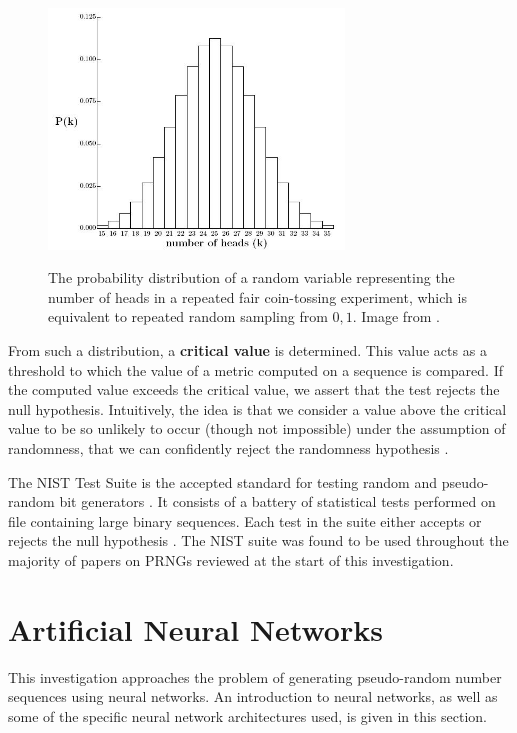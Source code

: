 \documentclass[12pt, titlepage]{report}
\theoremstyle{definition}
\begin{document}
\begin{figure}
\centering
\includegraphics[width=0.7\textwidth]{img/distribution.jpg}\\
\caption{The probability distribution of a random variable representing the number of heads in a repeated fair coin-tossing experiment, which is equivalent to repeated random sampling from ${0, 1}$. Image from \cite{terr2009math}.}
\label{figure:distribution}
\end{figure}
	
From such a distribution, a \textbf{critical value} is determined. This value acts as a threshold to which the value of a metric computed on a sequence is compared. If the computed value exceeds the critical value, we assert that the test rejects the null hypothesis. Intuitively, the idea is that we consider a value above the critical value to be so unlikely to occur (though not impossible) under the assumption of randomness, that we can confidently reject the randomness hypothesis \cite[p. 1.3]{rukhin2001statistical}.

The NIST Test Suite is the accepted standard for testing random and pseudo-random bit generators \cite{lavasani2009practical}. It consists of a battery of statistical tests performed on file containing large binary sequences. Each test in the suite either accepts or rejects the null hypothesis \cite{rukhin2001statistical}. The NIST suite was found to be used throughout the majority of papers on PRNGs reviewed at the start of this investigation.




\section{Artificial Neural Networks}
This investigation approaches the problem of generating pseudo-random number sequences using neural networks. An introduction to neural networks, as well as some of the specific neural network architectures used, is given in this section.
\end{document}
